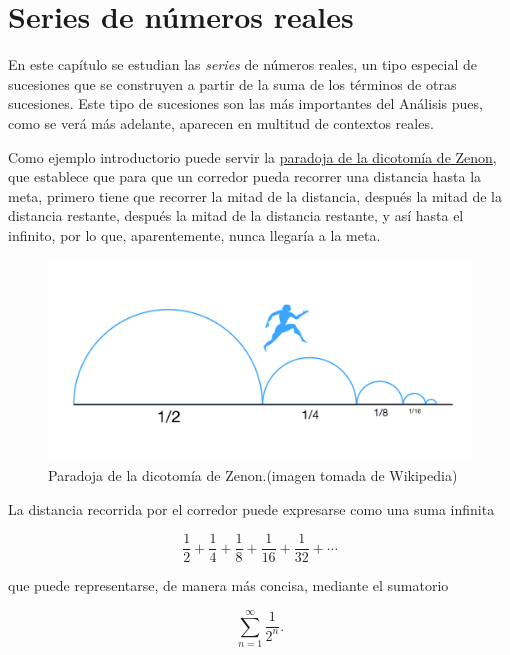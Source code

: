 \documentclass[
  a4paper,
]{scrreport}
\theoremstyle{definition}
\theoremstyle{plain}
\theoremstyle{definition}
\theoremstyle{definition}
\theoremstyle{plain}
\theoremstyle{plain}
\theoremstyle{remark}
\begin{document}
\chapter{Series de números reales}\label{series-de-nuxfameros-reales}

En este capítulo se estudian las \emph{series} de números reales, un
tipo especial de sucesiones que se construyen a partir de la suma de los
términos de otras sucesiones. Este tipo de sucesiones son las más
importantes del Análisis pues, como se verá más adelante, aparecen en
multitud de contextos reales.

Como ejemplo introductorio puede servir la
\href{https://es.wikipedia.org/wiki/Paradojas_de_Zen\%C3\%B3n\#Paradoja_de_la_dicotom\%C3\%ADa}{paradoja
de la dicotomía de Zenon}, que establece que para que un corredor pueda
recorrer una distancia hasta la meta, primero tiene que recorrer la
mitad de la distancia, después la mitad de la distancia restante,
después la mitad de la distancia restante, y así hasta el infinito, por
lo que, aparentemente, nunca llegaría a la meta.

\begin{figure}[H]

{\centering \includegraphics{img/series/paradoja-dicotomia-zenon.png}

}

\caption{Paradoja de la dicotomía de Zenon.(imagen tomada de Wikipedia)}

\end{figure}%

La distancia recorrida por el corredor puede expresarse como una suma
infinita

\[
\frac{1}{2}+\frac{1}{4}+\frac{1}{8}+\frac{1}{16}+\frac{1}{32}+\cdots
\]

que puede representarse, de manera más concisa, mediante el sumatorio

\[
\sum_{n=1}^\infty \frac{1}{2^n}.
\]
\end{document}
